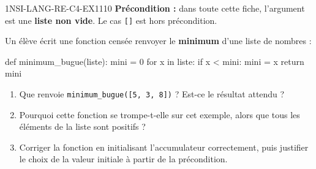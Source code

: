
\begin{exercice}{1NSI-LANG-RE-C4-EX1}{1}{10}
\textbf{Précondition :} dans toute cette fiche, l'argument est une
\textbf{liste non vide}. Le cas \lstinline{[]} est hors précondition.

Un élève écrit une fonction censée renvoyer le \textbf{minimum} d'une liste de nombres :
\begin{python}
def minimum_bugue(liste):
    mini = 0
    for x in liste:
        if x < mini:
            mini = x
    return mini
\end{python}
\begin{enumerate}
  \item Que renvoie \lstinline{minimum_bugue([5, 3, 8])} ? Est-ce le résultat attendu ?
  \item Pourquoi cette fonction se trompe-t-elle sur cet exemple, alors que tous les éléments de la liste sont positifs ?
  \item Corriger la fonction en initialisant l'accumulateur correctement, puis
  justifier le choix de la valeur initiale à partir de la précondition.
\end{enumerate}
\end{exercice}

%
